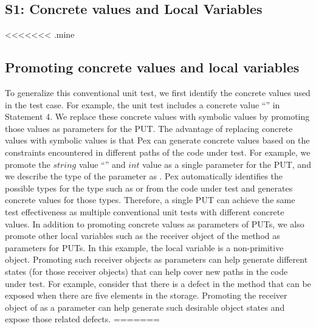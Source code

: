 \subsection{S1: Concrete values and Local Variables}

<<<<<<< .mine
\subsection{Promoting concrete values and local variables} 
To generalize this conventional unit test, we first identify the concrete values used in the test case. For example, the unit test includes a concrete  value ``'' in Statement 4. We replace these concrete values with symbolic values by promoting those values as parameters for the PUT. The advantage of replacing concrete values with symbolic values is that Pex can generate concrete values based on the constraints encountered in different paths of the code under test. For example, we promote the $string$ value ``'' and $int$ value  as a single parameter for the PUT, and we describe the type of the parameter as . Pex automatically identifies the possible types for the  type such as  or  from the code under test and generates concrete values for those types. Therefore, a single PUT can achieve the same test effectiveness as multiple conventional unit tests with different concrete values. In addition to promoting concrete values as parameters of PUTs, we also promote other local variables such as the receiver object of the  method as parameters for PUTs. In this example, the local variable  is a non-primitive object. Promoting such receiver objects as parameters can help generate different states (for those receiver objects) that can help cover new paths in the code under test. For example, consider that there is a defect in the  method that can be exposed when there are five elements in the storage. Promoting the receiver object of  as a parameter can help generate such desirable object states and expose those related defects. 
=======
